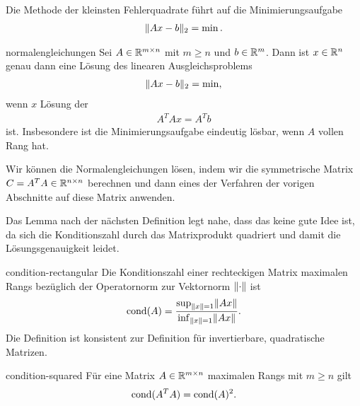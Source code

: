 \begin{intro}
  Die Methode der kleinsten Fehlerquadrate führt auf die Minimierungsaufgabe
  \begin{gather}
    \lVert Ax-b\rVert_2 = \min.
  \end{gather}
\end{intro}

\begin{Satz}{normalengleichungen}
  Sei $A\in \mathbb R^{m\times n}$ mit $m\ge n$ und $b\in \mathbb R^m$. Dann ist
  $x\in\mathbb R^n$ genau dann eine Lösung des linearen Ausgleichsproblems
  \begin{gather}
    \lVert Ax-b\rVert_2 = \min,
  \end{gather}
  wenn $x$ Lösung der 
  \begin{gather}
    A^TA x = A^Tb
  \end{gather}
  ist. Insbesondere ist die Minimierungsaufgabe eindeutig lösbar, wenn
  $A$ vollen Rang hat.
\end{Satz}

\begin{remark}
  Wir können die Normalengleichungen lösen, indem wir die symmetrische Matrix $C = A^TA\in \mathbb R^{n\times n}$ berechnen und dann eines der Verfahren der vorigen Abschnitte auf diese Matrix anwenden.
  
  Das Lemma nach der nächsten Definition legt nahe, dass das keine gute Idee ist, da sich die Konditionszahl durch das Matrixprodukt quadriert und damit die Lösungsgenauigkeit leidet.  
\end{remark}

\begin{Definition}{condition-rectangular}
  Die Konditionszahl einer rechteckigen Matrix maximalen Rangs bezüglich der Operatornorm zur Vektornorm $\lVert\cdot\rVert$ ist
  \begin{gather}
    \operatorname{cond}(A) = \frac{\sup_{\lVert x\rVert=1}\lVert Ax\rVert}{\inf_{\lVert x\rVert=1}\lVert Ax\rVert}.
    \end{gather}
  Die Definition ist konsistent zur Definition für invertierbare, quadratische Matrizen.
\end{Definition}

\begin{Lemma}{condition-squared}
  Für eine Matrix $A\in\mathbb R^{m\times n}$ maximalen Rangs mit $m\ge n$ gilt
  \begin{gather}
    \operatorname{cond}(A^TA) = \operatorname{cond}(A)^2.
  \end{gather}
\end{Lemma}

